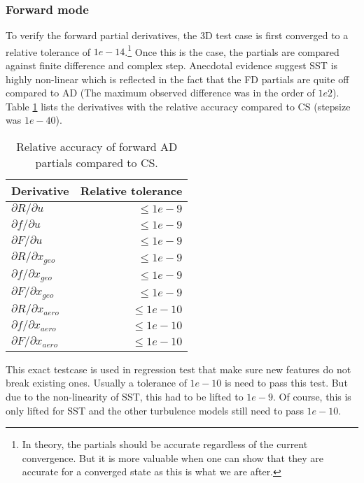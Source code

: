 \subsubsection{Forward mode}
\label{subsubsec:forward_ad}
To verify the forward partial derivatives, the 3D test case is first converged
to a relative tolerance of $1e-14$.\footnote{In theory, the partials should be
accurate regardless of the current convergence. But it is more valuable when
one can show that they are accurate for a converged state as this is what we
are after. } Once this is the case, the partials are compared against finite
difference and complex step. Anecdotal evidence suggest SST is highly
non-linear which is reflected in the fact that the FD partials are quite off
compared to AD (The maximum observed difference was in the order of $1e2$).
Table \ref{tab:partials_forward} lists the derivatives with the relative
accuracy compared to CS (stepsize was $1e-40$). 
\begin{table}[H]
    \centering
    \begin{tabular}{l r}
        \toprule
        Derivative                          & Relative tolerance \\
        \toprule
        $\partial R / \partial u$           & $\leq 1e-9$ \\
        $\partial f / \partial u$           & $\leq 1e-9$ \\
        $\partial F / \partial u$           & $\leq 1e-9$ \\
        \midrule
        $\partial R / \partial x_{geo}$     & $\leq 1e-9$ \\
        $\partial f / \partial x_{geo}$     & $\leq 1e-9$ \\
        $\partial F / \partial x_{geo}$     & $\leq 1e-9$ \\
        \midrule
        $\partial R / \partial x_{aero}$    & $\leq 1e-10$ \\
        $\partial f / \partial x_{aero}$    & $\leq 1e-10$ \\
        $\partial F / \partial x_{aero}$    & $\leq 1e-10$ \\
        \bottomrule
    \end{tabular}
    \caption{Relative accuracy of forward AD partials compared to CS.}
    \label{tab:partials_forward}
\end{table}

\noindent This exact testcase is used in regression test that make sure new
features do not break existing ones. Usually a tolerance of $1e-10$ is need to
pass this test. But due to the non-linearity of SST, this had to be lifted to
$1e-9$. Of course, this is only lifted for SST and the other turbulence models
still need to pass $1e-10$.


